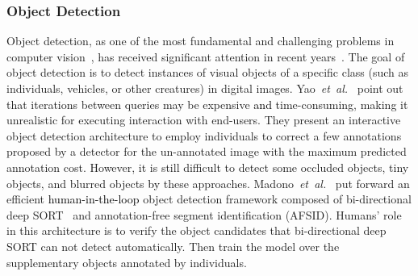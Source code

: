 \documentclass{article}
\newcommand\etal{\emph{et~al.}}
\newcommand{\REO}[1]{\textcolor{black}{#1}}
\newcommand{\ZJH}[1]{\textcolor{black}{#1}}
\begin{document}
\subsubsection{Object Detection}

Object detection, as one of the most fundamental and challenging problems in computer vision~\cite{girshick2015fast}, has received significant attention in recent years~\cite{zou2019object}. The goal of object detection is to detect instances of visual objects of a specific class (such as individuals, vehicles, or other creatures) in digital images.
Yao~\etal~\cite{yao2012interactive} point out that iterations between queries may be expensive \ZJH{and} time-consuming, making it unrealistic for executing interaction with end-users. They present an interactive object detection architecture to employ individuals to correct a few annotations proposed by a detector for the un-annotated image with the maximum predicted annotation cost. However, it is still difficult to detect some occluded objects, tiny objects, and blurred objects \ZJH{by} these approaches. Madono~\etal~\cite{madono2020efficient} put forward an efficient \REO{human-in-the-loop} object detection framework composed of bi-directional deep SORT~\cite{wojke2017simple} and annotation-free segment identification (AFSID). Humans' role in this architecture is to verify the object candidates that bi-directional deep SORT can not detect automatically. Then train the model over the supplementary objects annotated by individuals.
\end{document}
